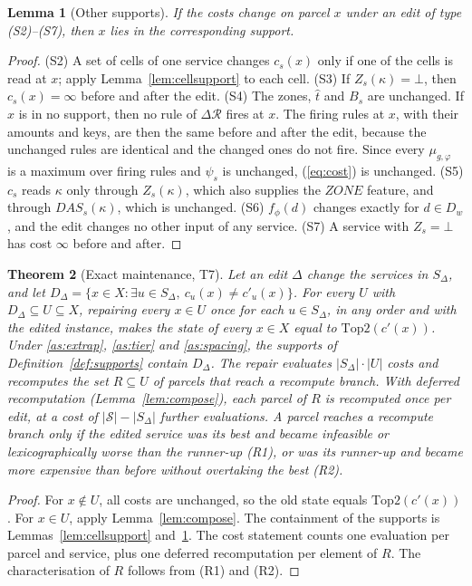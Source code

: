 \documentclass[11pt]{article}
\newtheorem{theorem}{Theorem}
\newtheorem{lemma}[theorem]{Lemma}
\theoremstyle{definition}
\theoremstyle{remark}
\newcommand{\SC}{\mathcal S}
\begin{document}
\begin{lemma}[Other supports]\label{lem:othersupports}
If the costs change on parcel $x$ under an edit of type (S2)--(S7), then $x$ lies in the
corresponding support.
\end{lemma}
\begin{proof}
(S2) A set of cells of one service changes $c_s(x)$ only if one of the cells is read at
$x$; apply Lemma~\ref{lem:cellsupport} to each cell. (S3) If $Z_s(\kappa)=\bot$, then
$c_s(x)=\infty$ before and after the edit. (S4) The zones, $\hat t$ and $B_s$ are unchanged.
If $x$ is in no support, then no rule of $\Delta\mathcal R$ fires at $x$. The firing rules at $x$,
with their amounts and keys, are then the same before and after the edit, because the
unchanged rules are identical and the changed ones do not fire. Since every
$\mu_{g,\varphi}$ is a maximum over firing rules and $\psi_s$ is unchanged,
(\ref{eq:cost}) is unchanged. (S5) $c_s$ reads $\kappa$ only through $Z_s(\kappa)$, which also
supplies the $\mathit{ZONE}$ feature, and through $\mathit{DAS}_s(\kappa)$, which is
unchanged. (S6) $f_\phi(d)$ changes exactly for $d\in D_w$, and the edit changes no other
input of any service. (S7) A service with $Z_s=\bot$ has cost $\infty$ before and after.
\end{proof}

\begin{theorem}[Exact maintenance, T7]\label{thm:T7}
Let an edit $\Delta$ change the services in $S_\Delta$, and let
$D_\Delta=\{x\in X:\exists u\in S_\Delta,\ c_u(x)\ne c'_u(x)\}$. For every $U$ with
$D_\Delta\subseteq U\subseteq X$, repairing every $x\in U$ once for each $u\in S_\Delta$, in any
order and with the edited instance, makes the state of every $x\in X$ equal to
$\mathrm{Top2}(c'(x))$. Under \ref{as:extrap}, \ref{as:tier} and \ref{as:spacing}, the
supports of Definition~\ref{def:supports} contain $D_\Delta$. The repair evaluates
$|S_\Delta|\cdot|U|$ costs and recomputes the set $R\subseteq U$ of parcels that reach a
recompute branch. With deferred recomputation (Lemma~\ref{lem:compose}), each parcel of
$R$ is recomputed once per edit, at a cost of $|\SC|-|S_\Delta|$ further evaluations. A parcel reaches a recompute branch only if the edited service was its best and became
infeasible or lexicographically worse than the runner-up (R1), or was its runner-up and
became more expensive than before without overtaking the best (R2).
\end{theorem}
\begin{proof}
For $x\notin U$, all costs are unchanged, so the old state equals $\mathrm{Top2}(c'(x))$. For
$x\in U$, apply Lemma~\ref{lem:compose}. The containment of the supports is
Lemmas~\ref{lem:cellsupport} and~\ref{lem:othersupports}. The cost statement counts one
evaluation per parcel and service, plus one deferred recomputation per element of $R$. The
characterisation of $R$ follows from (R1) and (R2).
\end{proof}
\end{document}
